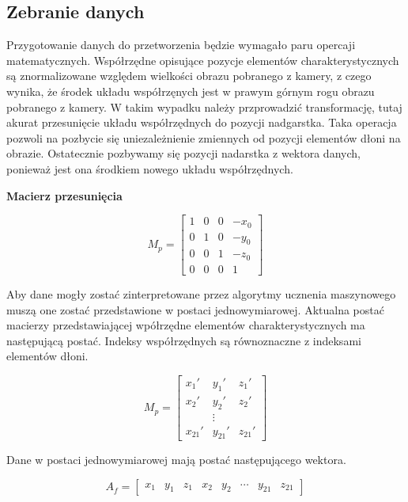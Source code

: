     \subsection{Zebranie danych}
    
    \quad Przygotowanie danych do przetworzenia będzie wymagało paru opercaji matematycznych. Współrzędne opisujące pozycje elementów charakterystycznych są znormalizowane względem wielkości obrazu pobranego z kamery, z czego wynika, że środek układu współrzęnych jest w prawym górnym rogu obrazu pobranego z kamery. W takim wypadku należy przprowadzić transformację, tutaj akurat przesunięcie układu współrzędnych do pozycji nadgarstka. Taka operacja pozwoli na pozbycie się uniezależnienie zmiennych od pozycji elementów dłoni na obrazie. Ostatecznie pozbywamy się pozycji nadarstka z wektora danych, ponieważ jest ona środkiem nowego układu współrzędnych. 
    
    \quad \textbf{Macierz przesunięcia}
    
    \begin{equation*}
        M_p = 
        \begin{bmatrix}
        1 & 0 & 0 & -x_0 \\
        0 & 1 & 0 & -y_0 \\
        0 & 0 & 1 & -z_0 \\
        0 & 0 & 0 & 1
        \end{bmatrix}
    \end{equation*}
    
    \quad Aby dane mogły zostać zinterpretowane przez algorytmy ucznenia maszynowego muszą one zostać przedstawione w postaci jednowymiarowej. Aktualna postać macierzy przedstawiającej wpółrzędne elementów charakterystycznych ma następującą postać. Indeksy współrzędnych są równoznaczne z indeksami elementów dłoni. 
    
    \begin{equation*}
        M_p = 
        \begin{bmatrix}
        x_1' & y_1' & z_1' \\
        x_2' & y_2' & z_2' \\
         & \vdots &     \\
        x_{21}' & y_{21}' & z_{21}'
        \end{bmatrix}
    \end{equation*}
    
    Dane w postaci jednowymiarowej mają postać następującego wektora. 
    
    \begin{equation*}
        A_f=
        \begin{bmatrix}
            x_1 & y_1 & z_1 & x_2 & y_2 & \cdots & y_{21} & z_{21}
        \end{bmatrix}
    \end{equation*}
    

